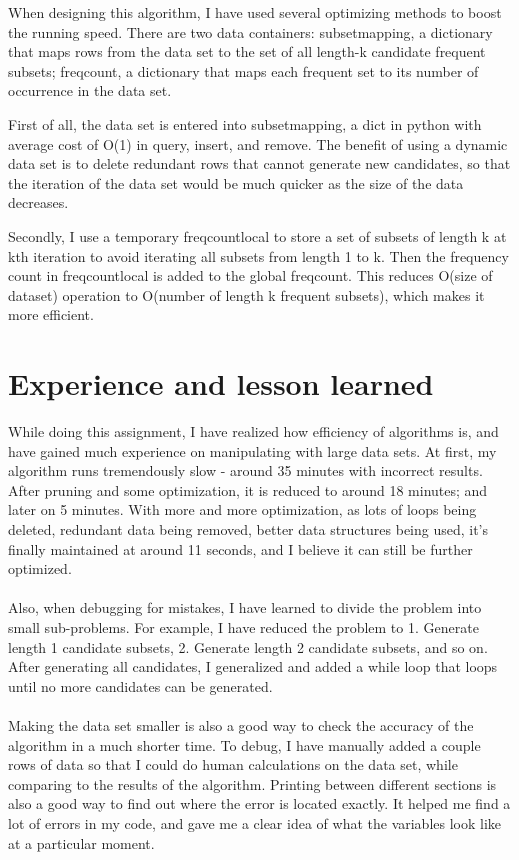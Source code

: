 \documentclass[12pt]{article}
\begin{document}
\begin{flushleft}
When designing this algorithm, I have used several optimizing methods to boost the running speed. There are two data containers: subset\textunderscore mapping, a dictionary that maps rows from the data set to the set of all length-k candidate frequent subsets; freq\textunderscore count, a dictionary that maps each frequent set to its number of occurrence in the data set.
\end{flushleft}
\begin{flushleft}
First of all, the data set is entered into subset\textunderscore mapping, a dict in python with average cost of O(1) in query, insert, and remove. The benefit of using a dynamic data set is to delete redundant rows that cannot generate new candidates, so that the iteration of the data set would be much quicker as the size of the data decreases.
\end{flushleft}
\begin{flushleft}
Secondly, I use a temporary freq\textunderscore count\textunderscore local to store a set of subsets of length k at kth iteration to avoid iterating all subsets from length 1 to k. Then the frequency count in freq\textunderscore count\textunderscore local is added to the global freq\textunderscore count. This reduces O(size of dataset) operation to O(number of length k frequent subsets), which makes it more efficient.
\end{flushleft}

\section*{Experience and lesson learned}
While doing this assignment, I have realized how efficiency of algorithms is, and have gained much experience on manipulating with large data sets. At first, my algorithm runs tremendously slow - around 35 minutes with incorrect results. After pruning and some optimization, it is reduced to around 18 minutes; and later on 5 minutes. With more and more optimization, as lots of loops being deleted, redundant data being removed, better data structures being used, it's finally maintained at around 11 seconds, and I believe it can still be further optimized.
\\\\
Also, when debugging for mistakes, I have learned to divide the problem into small sub-problems. For example, I have reduced the problem to 1. Generate length 1 candidate subsets, 2. Generate length 2 candidate subsets, and so on. After generating all candidates, I generalized and added a while loop that loops until no more candidates can be generated.
\\\\
Making the data set smaller is also a good way to check the accuracy of the algorithm in a much shorter time. To debug, I have manually added a couple rows of data so that I could do human calculations on the data set, while comparing to the results of the algorithm. Printing between different sections is also a good way to find out where the error is located exactly. It helped me find a lot of errors in my code, and gave me a clear idea of what the variables look like at a particular moment.
\end{document}
